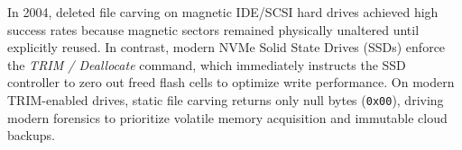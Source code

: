 \begin{perspectiva20}
In 2004, deleted file carving on magnetic IDE/SCSI hard drives achieved high success rates because magnetic sectors remained physically unaltered until explicitly reused. In contrast, modern NVMe Solid State Drives (SSDs) enforce the \textit{TRIM / Deallocate} command, which immediately instructs the SSD controller to zero out freed flash cells to optimize write performance. On modern TRIM-enabled drives, static file carving returns only null bytes (\texttt{0x00}), driving modern forensics to prioritize volatile memory acquisition and immutable cloud backups.
\end{perspectiva20}
